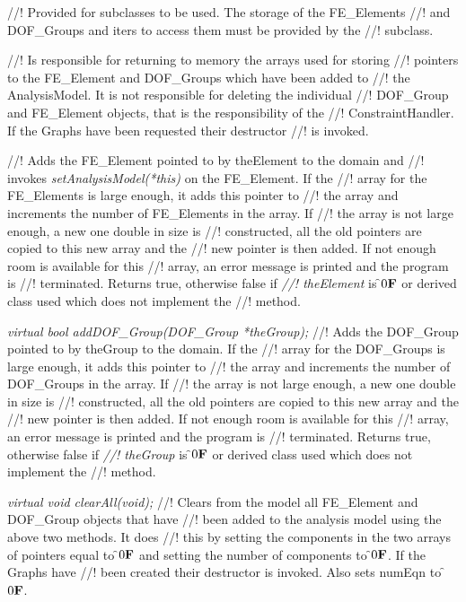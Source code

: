 //! Provided for subclasses to be used. The storage of the FE\_Elements
//! and DOF\_Groups and iters to access them must be provided by the
//! subclass.

//! Is responsible for returning to memory the arrays used for storing
//! pointers to the FE\_Element and DOF\_Groups which have been added to
//! the AnalysisModel. It is not responsible for deleting the individual
//! DOF\_Group and FE\_Element objects, that is the responsibility of the
//! ConstraintHandler. If the Graphs have been requested their destructor
//! is invoked. 

//! Adds the FE\_Element pointed to by \p theElement to the domain and
//! invokes {\em setAnalysisModel(*this)} on the FE\_Element. If the
//! array for the FE\_Elements is large enough, it adds this pointer to
//! the array and increments the number of FE\_Elements in the array. If
//! the array is not large enough, a new one double in size is
//! constructed, all the old pointers are copied to this new array and the
//! new pointer is then added. If not enough room is available for this
//! array, an error message is printed and the program is
//! terminated. Returns \p true, otherwise \p false if {\em
//! theElement} is \f$0{\bf F}$ or derived class used which does not implement the
//! method. 

{\em virtual bool addDOF\_Group(DOF\_Group *theGroup);}
//! Adds the DOF\_Group pointed to by \p theGroup to the domain. If the
//! array for the DOF\_Groups is large enough, it adds this pointer to
//! the array and increments the number of DOF\_Groups in the array. If
//! the array is not large enough, a new one double in size is
//! constructed, all the old pointers are copied to this new array and the
//! new pointer is then added. If not enough room is available for this
//! array, an error message is printed and the program is
//! terminated. Returns \p true, otherwise \p false if {\em
//! theGroup} is \f$0{\bf F}$ or derived class used which does not implement the
//! method. 



{\em virtual void clearAll(void);}
//! Clears from the model all FE\_Element and DOF\_Group objects that have
//! been added to the analysis model using the above two methods. It does
//! this by setting the components in the two arrays of pointers equal to
\f$0{\bf F}$ and setting the number of components to \f$0{\bf F}$. If the Graphs have
//! been created their destructor is invoked. Also sets \p numEqn to \f$0{\bf F}$.


